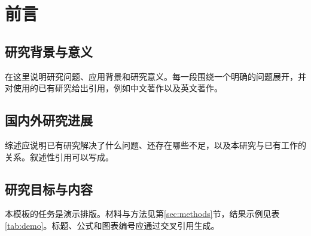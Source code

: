 \section{前言}\label{sec:introduction}
\subsection{研究背景与意义}
在这里说明研究问题、应用背景和研究意义。每一段围绕一个明确的问题展开，并对使用的已有研究给出引用，例如中文著作\parencite{qiu2020nndl}以及英文著作\parencite{goodfellow2016deep}。
\subsection{国内外研究进展}
综述应说明已有研究解决了什么问题、还存在哪些不足，以及本研究与已有工作的关系。叙述性引用可以写成\textcite{goodfellow2016deep}。
\subsection{研究目标与内容}
本模板的任务是演示排版。材料与方法见第\ref{sec:methods}节，结果示例见表\ref{tab:demo}。标题、公式和图表编号应通过交叉引用生成。
